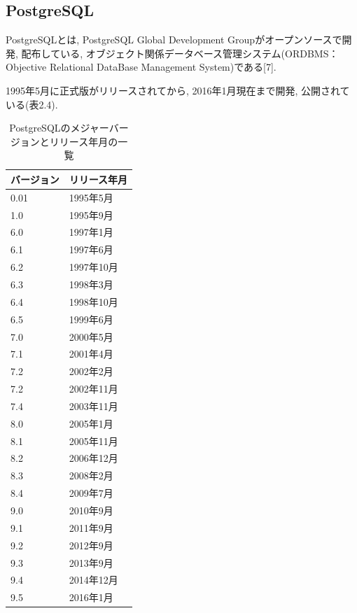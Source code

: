\subsection{PostgreSQL}
PostgreSQLとは, PostgreSQL Global Development Groupがオープンソースで開発, 配布している, オブジェクト関係データベース管理システム(ORDBMS：Objective Relational DataBase Management System)である[7].

1995年5月に正式版がリリースされてから, 2016年1月現在まで開発, 公開されている(表2.4).

\begin{table}[tb]
\begin{center}
\begin{tabular}{|l|l|} \hline
バージョン & リリース年月 \\ \hline \hline
0.01 & 1995年5月 \\ \hline
1.0 & 1995年9月 \\ \hline
6.0 & 1997年1月 \\ \hline
6.1 & 1997年6月 \\ \hline
6.2 & 1997年10月 \\ \hline
6.3 & 1998年3月 \\ \hline
6.4 & 1998年10月 \\ \hline
6.5 & 1999年6月 \\ \hline
7.0 & 2000年5月 \\ \hline
7.1 & 2001年4月 \\ \hline
7.2 & 2002年2月 \\ \hline
7.2 & 2002年11月 \\ \hline
7.4 & 2003年11月 \\ \hline
8.0 & 2005年1月 \\ \hline
8.1 & 2005年11月 \\ \hline
8.2 & 2006年12月 \\ \hline
8.3 & 2008年2月 \\ \hline
8.4 & 2009年7月 \\ \hline
9.0 & 2010年9月 \\ \hline
9.1 & 2011年9月 \\ \hline
9.2 & 2012年9月 \\ \hline
9.3 & 2013年9月 \\ \hline
9.4 & 2014年12月 \\ \hline
9.5 & 2016年1月 \\ \hline
\end{tabular}
\caption{PostgreSQLのメジャーバージョンとリリース年月の一覧}
\end{center}
\end{table}


